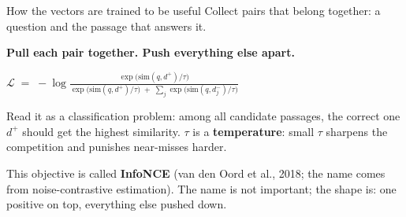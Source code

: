 \documentclass[aspectratio=169]{beamer}
\newcommand{\watchbox}[1]{%
  \begin{tcolorbox}[colback=armorange!12, colframe=armorange, boxrule=0.6pt, arc=2pt]
  #1
  \end{tcolorbox}}
\begin{document}
\begin{frame}{How the vectors are trained to be useful}
  \vspace{0.6em}
  Collect pairs that belong together: a question and the passage that answers it.

  \vspace{0.6em}
  \begin{center}
    \textbf{Pull each pair together. Push everything else apart.}
  \end{center}

  \vspace{0.6em}
  \begin{center}
    $\displaystyle
      \mathcal{L} \;=\; -\log
      \frac{\exp\!\big(\text{sim}(q, d^{+})/\tau\big)}
           {\exp\!\big(\text{sim}(q, d^{+})/\tau\big) \;+\; \sum_{j}\exp\!\big(\text{sim}(q, d_j^{-})/\tau\big)}
    $
  \end{center}

  \vspace{0.9em}
  {\small Read it as a classification problem: among all candidate passages, the correct
  one $d^{+}$ should get the highest similarity. $\tau$ is a \textbf{temperature}: small
  $\tau$ sharpens the competition and punishes near-misses harder.}

  \vspace{0.6em}
  \watchbox{This objective is called \textbf{InfoNCE} (van den Oord et al., 2018; the name comes from noise-contrastive
  estimation). The name is not important; the shape
  is: one positive on top, everything else pushed down.}
\end{frame}
\end{document}
